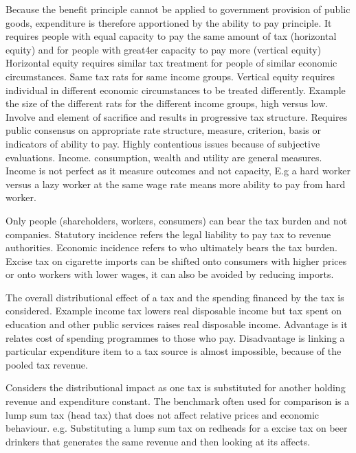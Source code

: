 \documentclass[12pt]{examnotes}
\begin{document}
\ra Because the benefit principle cannot be applied to government provision of public goods, expenditure is therefore apportioned by the ability to pay principle. 
\ra It requires people with equal capacity to pay the same amount of tax (horizontal equity) and for people with great4er capacity to pay more (vertical equity)
\ra Horizontal equity requires similar tax treatment for people of similar economic circumstances. Same tax rats for same income groups.
\ra Vertical equity requires individual in different economic circumstances to be treated differently. Example the size of the different rats for the different income groups, high versus low. Involve and element of sacrifice and results in progressive tax structure.
\ra Requires public consensus on appropriate rate structure, measure, criterion, basis or indicators of ability to pay. Highly contentious issues because of subjective evaluations.
\ra Income. consumption, wealth and utility are general measures.
\ra Income is not perfect as it measure outcomes and not capacity, E.g a hard worker versus a lazy worker at the same wage rate means more ability to pay from hard worker.

\ra Only people (shareholders, workers, consumers) can bear the tax burden and not companies.
\ra Statutory incidence refers the legal liability to pay tax to revenue authorities.
\ra Economic incidence refers to who ultimately bears the tax burden. Excise tax on cigarette imports  can be shifted onto consumers with higher prices or onto workers with lower wages, it can also be avoided by reducing imports.

\ra The overall distributional effect of a tax and the spending financed by the tax is considered.
\ra Example income tax lowers real disposable income but tax spent on education and other public services raises real disposable income.  
\ra Advantage is it relates cost of spending programmes to those who pay.
\ra Disadvantage is linking a particular expenditure item to a tax source is almost impossible, because of the pooled tax revenue.

\ra Considers the distributional impact as one tax is substituted for another holding revenue and expenditure constant.
\ra The benchmark often used for comparison is a lump sum tax (head tax) that does not affect relative prices and economic behaviour.
\ra e.g. Substituting a lump sum tax on redheads for a excise tax on beer drinkers that generates the same revenue and then looking at its affects.
\end{document}
